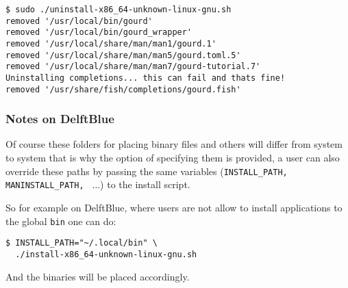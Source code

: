 \begin{verbatim}
$ sudo ./uninstall-x86_64-unknown-linux-gnu.sh
removed '/usr/local/bin/gourd'
removed '/usr/local/bin/gourd_wrapper'
removed '/usr/local/share/man/man1/gourd.1'
removed '/usr/local/share/man/man5/gourd.toml.5'
removed '/usr/local/share/man/man7/gourd-tutorial.7'
Uninstalling completions... this can fail and thats fine!
removed '/usr/share/fish/completions/gourd.fish'
\end{verbatim}


\subsubsection{Notes on DelftBlue}
\label{sec:installexample2}

Of course these folders for placing binary files and others will differ from system to system
that is why the option of specifying them is provided, a user can also override these paths by
passing the same variables (\texttt{INSTALL\_PATH, MANINSTALL\_PATH, } $\dots$) to the install script.

So for example on DelftBlue, where users are not allow to install applications
to the global \texttt{bin} one can do:

\begin{verbatim}
$ INSTALL_PATH="~/.local/bin" \
  ./install-x86_64-unknown-linux-gnu.sh
\end{verbatim}

And the binaries will be placed accordingly.
